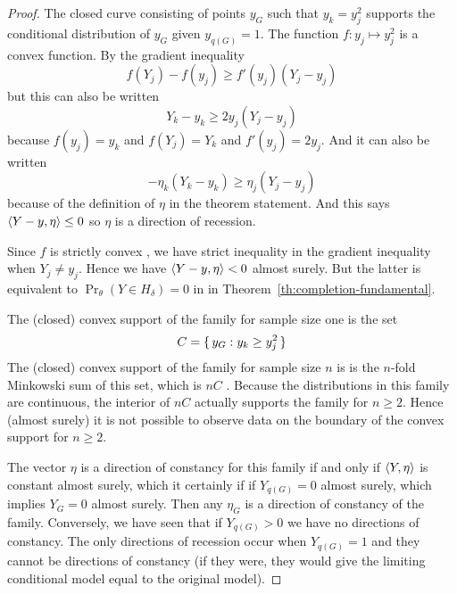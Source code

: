 \begin{proof}
The closed curve consisting of points $y_G$ such that $y_k = y_j^2$
supports the conditional distribution of $y_G$ given $y_{q(G)} = 1$.
The function $f : y_j \mapsto y_j^2$ is a convex function.
By the gradient inequality \citep[Theorem~2.13 (b)]{rockafellar-wets}
$$
   f(Y_j) - f(y_j) \ge f'(y_j) (Y_j - y_j)
$$
but this can also be written
$$
   Y_k - y_k \ge 2 y_j (Y_j - y_j)
$$
because $f(y_j) = y_k$ and $f(Y_j) = Y_k$ and $f'(y_j) = 2 y_j$.
And it can also be written
$$
   - \eta_k (Y_k - y_k) \ge \eta_j (Y_j - y_j)
$$
because of the definition of $\eta$ in the theorem statement.
And this says $\langle Y - y, \eta \rangle \le 0$ so $\eta$ is a direction of
recession.

Since $f$ is strictly convex
\citep[Theorem~2.13 ($\text{a}'$)]{rockafellar-wets},
we have strict inequality in the gradient inequality
\citep[Theorem~2.13 ($\text{b}'$)]{rockafellar-wets} when $Y_j \neq y_j$.
Hence we have \hbox{$\langle Y - y, \eta \rangle < 0$} almost surely.
But the latter is equivalent to $\Pr_\theta(Y \in H_\delta) = 0$ in
in Theorem~\ref{th:completion-fundamental}.

The (closed) convex support of the family for sample size one is
the set
$$
   C = \{\,  y_G : y_k \ge y_j^2  \,\}
$$
The (closed) convex support of the family for sample size $n$ is
is the $n$-fold Minkowski sum of this set, which is $n C$
\citep[Proposition~2.23]{rockafellar-wets}.  Because the distributions
in this family are continuous, the interior of $n C$ actually supports
the family for $n \ge 2$.  Hence (almost surely) it is not possible
to observe data on the boundary of the convex support for $n \ge 2$.

The vector $\eta$ is a direction of constancy for this family if and only
if $\langle Y, \eta \rangle$ is constant almost surely, which it certainly if if
$Y_{q(G)} = 0$ almost surely, which implies $Y_G = 0$ almost surely.
Then any $\eta_G$ is a direction of constancy of the family.
Conversely, we have seen that if $Y_{q(G)} > 0$ we have no directions of
constancy.  The only directions of recession occur when $Y_{q(G)} = 1$
and they cannot be directions of constancy (if they were, they would
give the limiting conditional model equal to the original model).
\end{proof}

